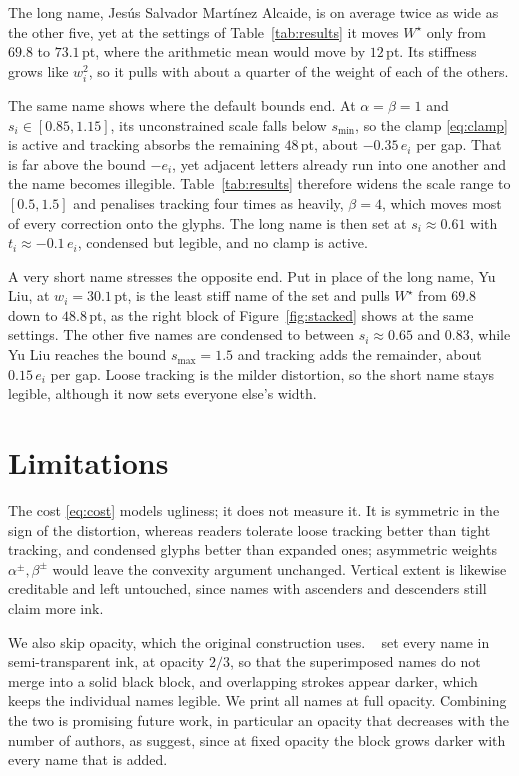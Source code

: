 \documentclass[10pt,twocolumn]{article}
\theoremstyle{plain}
\theoremstyle{definition}
\begin{document}
  The long name, Jes\'us Salvador Mart\'inez Alcaide, is on average twice as wide as the other five, yet at the settings of Table~\ref{tab:results} it moves $W^\star$ only from $69.8$ to $73.1$\,pt, where the arithmetic mean would move by $12$\,pt.
  Its stiffness grows like $w_i^2$, so it pulls with about a quarter of the weight of each of the others.

  The same name shows where the default bounds end.
  At $\alpha = \beta = 1$ and $s_i \in [0.85, 1.15]$, its unconstrained scale falls below $s_{\min}$, so the clamp \eqref{eq:clamp} is active and tracking absorbs the remaining $48$\,pt, about $-0.35\,e_i$ per gap.
  That is far above the bound $-e_i$, yet adjacent letters already run into one another and the name becomes illegible.
  Table~\ref{tab:results} therefore widens the scale range to $[0.5, 1.5]$ and penalises tracking four times as heavily, $\beta = 4$, which moves most of every correction onto the glyphs.
  The long name is then set at $s_i \approx 0.61$ with $t_i \approx -0.1\,e_i$, condensed but legible, and no clamp is active.

  A very short name stresses the opposite end.
  Put in place of the long name, Yu Liu, at $w_i = 30.1$\,pt, is the least stiff name of the set and pulls $W^\star$ from $69.8$ down to $48.8$\,pt, as the right block of Figure~\ref{fig:stacked} shows at the same settings.
  The other five names are condensed to between $s_i \approx 0.65$ and $0.83$, while Yu Liu reaches the bound $s_{\max} = 1.5$ and tracking adds the remainder, about $0.15\,e_i$ per gap.
  Loose tracking is the milder distortion, so the short name stays legible, although it now sets everyone else's width.

  \section{Limitations}
  The cost \eqref{eq:cost} models ugliness; it does not measure it.
  It is symmetric in the sign of the distortion, whereas readers tolerate loose tracking better than tight tracking, and condensed glyphs better than expanded ones; asymmetric weights $\alpha^\pm,\beta^\pm$ would leave the convexity argument unchanged.
  Vertical extent is likewise creditable and left untouched, since names with ascenders and descenders still claim more ink.

  We also skip opacity, which the original construction uses.
  \citeauthor{demaine2023every}~\cite{demaine2023every} set every name in semi-transparent ink, at opacity $2/3$, so that the superimposed names do not merge into a solid black block, and overlapping strokes appear darker, which keeps the individual names legible.
  We print all names at full opacity.
  Combining the two is promising future work, in particular an opacity that decreases with the number of authors, as \citeauthor{demaine2023every} suggest, since at fixed opacity the block grows darker with every name that is added.
\end{document}
